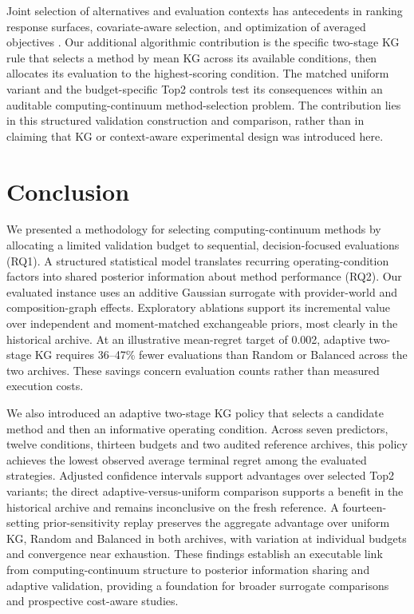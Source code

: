 \documentclass[10pt,a4paper]{article}
\begin{document}
Joint selection of alternatives and evaluation contexts has antecedents in ranking response surfaces, covariate-aware selection, and optimization of averaged objectives \cite{hu2017,shen2017,toscano2022,ding2022}. Our additional algorithmic contribution is the specific two-stage KG rule that selects a method by mean KG across its available conditions, then allocates its evaluation to the highest-scoring condition. The matched uniform variant and the budget-specific Top2 controls test its consequences within an auditable computing-continuum method-selection problem. The contribution lies in this structured validation construction and comparison, rather than in claiming that KG or context-aware experimental design was introduced here.

\section{Conclusion}
We presented a methodology for selecting computing-continuum methods by allocating a limited validation budget to sequential, decision-focused evaluations (RQ1). A structured statistical model translates recurring operating-condition factors into shared posterior information about method performance (RQ2). Our evaluated instance uses an additive Gaussian surrogate with provider-world and composition-graph effects. Exploratory ablations support its incremental value over independent and moment-matched exchangeable priors, most clearly in the historical archive. At an illustrative mean-regret target of 0.002, adaptive two-stage KG requires 36--47\% fewer evaluations than Random or Balanced across the two archives. These savings concern evaluation counts rather than measured execution costs.

We also introduced an adaptive two-stage KG policy that selects a candidate method and then an informative operating condition. Across seven predictors, twelve conditions, thirteen budgets and two audited reference archives, this policy achieves the lowest observed average terminal regret among the evaluated strategies. Adjusted confidence intervals support advantages over selected Top2 variants; the direct adaptive-versus-uniform comparison supports a benefit in the historical archive and remains inconclusive on the fresh reference. A fourteen-setting prior-sensitivity replay preserves the aggregate advantage over uniform KG, Random and Balanced in both archives, with variation at individual budgets and convergence near exhaustion. These findings establish an executable link from computing-continuum structure to posterior information sharing and adaptive validation, providing a foundation for broader surrogate comparisons and prospective cost-aware studies.
\end{document}
